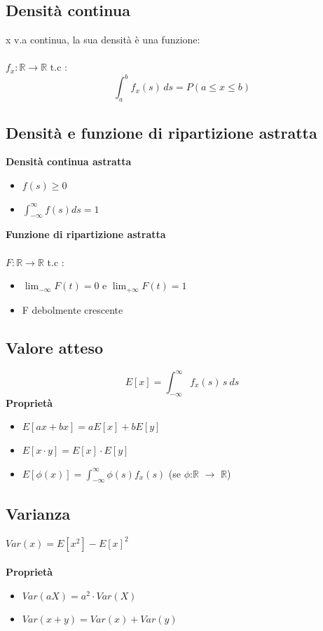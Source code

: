 \subsection{Densità continua}
x v.a continua, la sua densità è una funzione: \\ \\
$f_{x} : \mathbb{R} \rightarrow \mathbb{R}$ t.c : \\
\[ \int_{a}^{b} f_{x}(s) \,ds  = P(a \leq x \leq b)\]
\subsection{Densità e funzione di ripartizione astratta}
\textbf{Densità continua astratta}
\begin{itemize} 
	\item $f(s) \geq 0$
	\item  $ \int_{-\infty}^{\infty} f(s)ds  = 1 $
\end{itemize}
\textbf{Funzione di ripartizione astratta} \\ \\
$F : \mathbb{R} \rightarrow \mathbb{R}$ t.c : 
\begin{itemize}
	\item $\lim_{-\infty} F(t) = 0$ e $\lim_{+\infty}  F(t) = 1$
	\item F debolmente crescente
\end{itemize}
\subsection{Valore atteso}
\[ E[x] = \int_{-\infty}^{\infty} f_{x}(s) \,s \ ds\]
\textbf{Proprietà} \\
\begin{itemize}
	\item $E[ax + bx] = aE[x] + bE[y]$
	\item $E[x \cdot y] = E[x] \cdot E[y]$
	\item $E[\phi(x)] = \int_{-\infty}^{\infty} \phi(s)f_{x}(s)$ (se $\phi$:$\mathbb{R}$ $\rightarrow$ $\mathbb{R}$)
\end{itemize}
\newpage
\subsection{Varianza}
$Var(x) = E[x^2] - E[x]^2$ \\ \\
\textbf{Proprietà}
\begin{itemize}
	\item $Var(aX) = a^2 \cdot Var(X)$
	\item $Var(x + y) = Var(x) + Var(y)$
\end{itemize}
